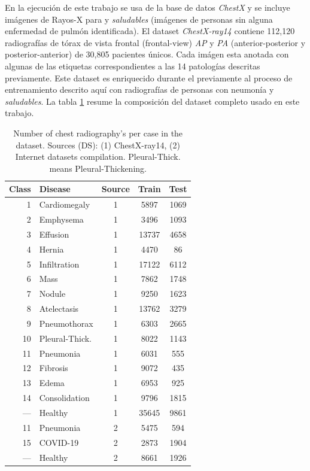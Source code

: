 {En la ejecución de este trabajo se usa de la base de datos \textit{ChestX}
\cite{wang2017chestx} y se incluye imágenes de Rayos-X para  y \textit{saludables}
(imágenes de personas sin alguna enfermedad de pulmón identificada). El dataset \textit{ChestX-ray14}
contiene 112,120 radiografías de tórax de vista frontal (frontal-view) \textit{AP} y \textit{PA}
(anterior-posterior y posterior-anterior) de 30,805 pacientes únicos. Cada imágen esta anotada con
algunas de las etiquetas correspondientes a las 14 patologías descritas previamente. Este dataset es
enriquecido durante el previamente al proceso de entrenamiento descrito aquí con radiografías de
personas con neumonía y \textit{saludables}. La tabla \ref{table_dataset} resume la composición del
dataset completo usado en este trabajo.

\begin{table}[!ht]
    \centering
    \begin{tabular}{| r |l | c | c | c |}
     \hline
     Class & Disease & Source & Train & Test  \\
     \hline\hline
     1  & Cardiomegaly       & 1 & 5897  & 1069 \\
     2  & Emphysema          & 1 & 3496  & 1093 \\
     3  & Effusion           & 1 & 13737 & 4658 \\
     4  & Hernia             & 1 & 4470  & 86   \\
     5  & Infiltration       & 1 & 17122 & 6112 \\
     6  & Mass               & 1 & 7862  & 1748 \\
     7  & Nodule             & 1 & 9250  & 1623 \\
     8  & Atelectasis        & 1 & 13762 & 3279 \\
     9  & Pneumothorax       & 1 & 6303  & 2665 \\
     10 & Pleural-Thick.     & 1 & 8022  & 1143 \\
     11 & Pneumonia          & 1 & 6031  & 555  \\
     12 & Fibrosis           & 1 & 9072  & 435  \\
     13 & Edema              & 1 & 6953  & 925  \\
     14 & Consolidation      & 1 & 9796  & 1815 \\
     ---&  Healthy           & 1 & 35645 & 9861 \\
     \hline
     11 & Pneumonia          & 2 & 5475  & 594  \\
     15 & COVID-19           & 2 & 2873  & 1904 \\
     ---&  Healthy           & 2 & 8661  & 1926 \\
     \hline
    \end{tabular}
    \caption{Number of chest radiography's per case in the dataset. Sources (DS): (1) ChestX-ray14,
             (2) Internet datasets compilation. Pleural-Thick. means Pleural-Thickening.}
    \label{table_dataset}
\end{table}

}
